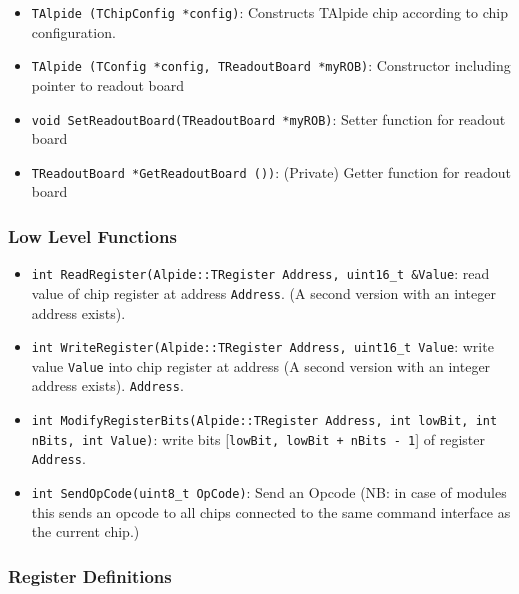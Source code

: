 \documentclass{article}
\begin{document}
\begin{itemize}
\item \texttt{TAlpide (TChipConfig *config)}: \newline
  Constructs TAlpide chip according to chip configuration.
\item \texttt{TAlpide (TConfig *config, TReadoutBoard *myROB)}: \newline Constructor
  including pointer to readout board
\item \texttt{void SetReadoutBoard(TReadoutBoard *myROB)}: \newline
  Setter function for readout board
\item \texttt{TReadoutBoard *GetReadoutBoard ())}: \newline (Private)
  Getter function for readout board
\end{itemize}


\subsubsection {Low Level Functions}

\begin{itemize}
\item \texttt{int ReadRegister(Alpide::TRegister Address, uint16\_t
    \&Value}: \newline read value of chip register at address
  \texttt{Address}. (A second version with an integer address
  exists).
\item \texttt{int WriteRegister(Alpide::TRegister Address, uint16\_t
    Value}: \newline write value \texttt{Value} into chip register at
  address (A second version with an integer address
  exists).
\texttt{Address}.
\item \texttt{int ModifyRegisterBits(Alpide::TRegister Address, int
    lowBit, int nBits, int Value)}: write bits [\texttt{lowBit, lowBit + nBits
  - 1}] of register \texttt{Address}. 
\item \texttt{int SendOpCode(uint8\_t OpCode)}: \newline Send an Opcode
  (NB: in case of modules this sends an opcode to all chips connected
  to the same command interface as the current chip.)
\end{itemize}




\subsubsection {Register Definitions} 
\end{document}
